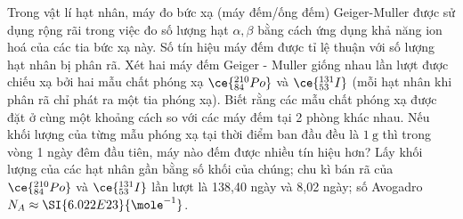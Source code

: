 \begin{ex}
Trong vật lí hạt nhân, máy đo bức xạ (máy đếm/ống đếm) Geiger-Muller được sử dụng rộng rãi trong việc đo số lượng hạt $\alpha, \beta$ bằng cách ứng dụng khả năng ion hoá của các tia bức xạ này. Số tín hiệu máy đếm được tỉ lệ thuận với số lượng hạt nhân bị phân rã. Xét hai máy đếm Geiger - Muller giống nhau lần lượt được chiếu xạ bởi hai mẫu chất phóng xạ $\ce{_{84}^{210}Po}$ và $\ce{_{53}^{131}I}$ (mỗi hạt nhân khi phân rã chỉ phát ra một tia phóng xạ). Biết rằng các mẫu chất phóng xạ được đặt ở cùng một khoảng cách so với các máy đếm tại 2 phòng khác nhau. Nếu khối lượng của từng mẫu phóng xạ tại thời điểm ban đầu đều là $\SI{1}{\gram}$ thì trong vòng 1 ngày đêm đầu tiên, máy nào đếm được nhiều tín hiệu hơn? Lấy khối lượng của các hạt nhân gần bằng số khối của chúng; chu kì bán rã của $\ce{_{84}^{210}Po}$ và $\ce{_{53}^{131}I}$ lần lượt là 138,40 ngày và 8,02 ngày; số Avogadro $N_{A} \approx \SI{6.022E23}{\mole^{-1}}$.	
\end{ex}

